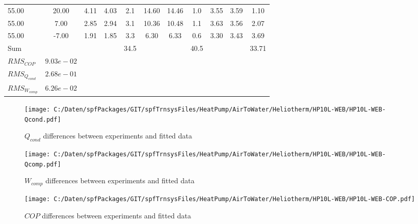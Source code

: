 \documentclass[english]{SPFShortReport}
\begin{document}
\begin{table}[!ht]
\begin{small}
\begin{center}
{\begin{tabular}{l | c c c c c c c c c c }
55.00  & 20.00 & 4.11 & 4.03 & 2.1 & 14.60 & 14.46 & 1.0 & 3.55 & 3.59 & 1.10\\ 
55.00  & 7.00 & 2.85 & 2.94 & 3.1 & 10.36 & 10.48 & 1.1 & 3.63 & 3.56 & 2.07\\ 
55.00  & -7.00 & 1.91 & 1.85 & 3.3 & 6.30 & 6.33 & 0.6 & 3.30 & 3.43 & 3.69\\ 
\hline 
 Sum &  & &  & 34.5 &  &  & 40.5 & &  & 33.71\\ 
\hline 
 $RMS_{COP}$ & $9.03e-02$ \\ 
 $RMS_{Q_{cond}}$ & $2.68e-01$ \\ 
 $RMS_{W_{comp}}$ & $6.26e-02$ \\ 
\hline
\hline
\end{tabular}
}
\label{ErrorsTable}
\end{center}
\end{small}
\end{table}
\begin{figure}[!ht]
\begin{center}
\texttt{[image: C:/Daten/spfPackages/GIT/spfTrnsysFiles/HeatPump/AirToWater/Heliotherm/HP10L-WEB/HP10L-WEB-Qcond.pdf]}
\caption{$Q_{cond}$ differences between experiments and fitted data}
\label{QcongFig}
\end{center}
\end{figure}
\begin{figure}[!ht]
\begin{center}
\texttt{[image: C:/Daten/spfPackages/GIT/spfTrnsysFiles/HeatPump/AirToWater/Heliotherm/HP10L-WEB/HP10L-WEB-Qcomp.pdf]}
\caption{$W_{comp}$ differences between experiments and fitted data}
\label{QcompFig}
\end{center}
\end{figure}
\begin{figure}[!ht]
\begin{center}
\texttt{[image: C:/Daten/spfPackages/GIT/spfTrnsysFiles/HeatPump/AirToWater/Heliotherm/HP10L-WEB/HP10L-WEB-COP.pdf]}
\caption{$COP$ differences between experiments and fitted data}
\label{COPFig}
\end{center}
\end{figure}
\end{document}
